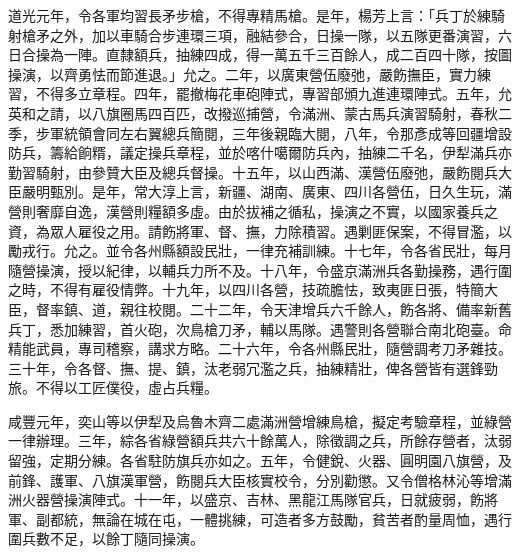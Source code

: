 \begin{pinyinscope}
道光元年，令各軍均習長矛步槍，不得專精馬槍。是年，楊芳上言：「兵丁於練騎射槍矛之外，加以車騎合步連環三項，融結參合，日操一隊，以五隊更番演習，六日合操為一陣。直隸額兵，抽練四成，得一萬五千三百餘人，成二百四十隊，按圖操演，以齊勇怯而節進退。」允之。二年，以廣東營伍廢弛，嚴飭撫臣，實力練習，不得多立章程。四年，罷撤梅花車砲陣式，專習部頒九進連環陣式。五年，允英和之請，以八旗圈馬四百匹，改撥巡捕營，令滿洲、蒙古馬兵演習騎射，春秋二季，步軍統領會同左右翼總兵簡閱，三年後親臨大閱，八年，令那彥成等回疆增設防兵，籌給餉糈，議定操兵章程，並於喀什噶爾防兵內，抽練二千名，伊犁滿兵亦勤習騎射，由參贊大臣及總兵督操。十五年，以山西滿、漢營伍廢弛，嚴飭閱兵大臣嚴明甄別。是年，常大淳上言，新疆、湖南、廣東、四川各營伍，日久生玩，滿營則奢靡自逸，漢營則糧額多虛。由於拔補之循私，操演之不實，以國家養兵之資，為眾人雇役之用。請飭將軍、督、撫，力除積習。遇剿匪保案，不得冒濫，以勵戎行。允之。並令各州縣額設民壯，一律充補訓練。十七年，令各省民壯，每月隨營操演，授以紀律，以輔兵力所不及。十八年，令盛京滿洲兵各勤操務，遇行圍之時，不得有雇役情弊。十九年，以四川各營，技疏膽怯，致夷匪日張，特簡大臣，督率鎮、道，親往校閱。二十二年，令天津增兵六千餘人，飭各將、備率新舊兵丁，悉加練習，首火砲，次鳥槍刀矛，輔以馬隊。遇警則各營聯合南北砲臺。命精能武員，專司稽察，講求方略。二十六年，令各州縣民壯，隨營調考刀矛雜技。三十年，令各督、撫、提、鎮，汰老弱冗濫之兵，抽練精壯，俾各營皆有選鋒勁旅。不得以工匠僕役，虛占兵糧。

咸豐元年，奕山等以伊犁及烏魯木齊二處滿洲營增練鳥槍，擬定考驗章程，並綠營一律辦理。三年，綜各省綠營額兵共六十餘萬人，除徵調之兵，所餘存營者，汰弱留強，定期分練。各省駐防旗兵亦如之。五年，令健銳、火器、圓明園八旗營，及前鋒、護軍、八旗漢軍營，飭閱兵大臣核實校令，分別勸懲。又令僧格林沁等增滿洲火器營操演陣式。十一年，以盛京、吉林、黑龍江馬隊官兵，日就疲弱，飭將軍、副都統，無論在城在屯，一體挑練，可造者多方鼓勵，貧苦者酌量周恤，遇行圍兵數不足，以餘丁隨同操演。


\end{pinyinscope}
